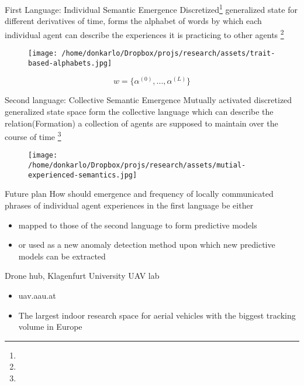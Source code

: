\documentclass[unknownkeysallowed]{beamer}
\begin{document}
	\begin{frame}{First Language: Individual Semantic Emergence}
		Discretized\footnote{} generalized state for different derivatives of time, forms the alphabet of words by which each individual agent can describe the experiences it is practicing to other agents \footnote{}
		\begin{figure}
			\texttt{[image: /home/donkarlo/Dropbox/projs/research/assets/trait-based-alphabets.jpg]}
			\caption{}
		\end{figure}
		\begin{equation}
			w = \{\alpha^{(0)},...,\alpha^{(L)}\}
		\end{equation}
	\end{frame}

	\begin{frame}{Second language: Collective Semantic Emergence}
		Mutually activated discretized generalized state space form the collective language which can describe the relation(Formation) a collection of agents are supposed to maintain over the course of time \footnote{}
		\begin{figure}
			\texttt{[image: /home/donkarlo/Dropbox/projs/research/assets/mutial-experienced-semantics.jpg]}
			\caption{}
		\end{figure}
	\end{frame}

	\begin{frame}{Future plan}
		How should emergence and frequency of locally communicated phrases of individual agent experiences in the first language be either 
		\begin{itemize}
			\item mapped to those of the second language to form predictive models
			\item or used as a new anomaly detection method upon which new predictive models can be extracted
		\end{itemize}
	\end{frame}

	\begin{frame}{Drone hub, Klagenfurt University UAV lab}
		\begin{itemize}
			\item {\color{blue} uav.aau.at}
			\item The largest indoor research space for aerial vehicles with the biggest tracking volume in Europe
		\end{itemize}
	\end{frame}
\end{document}
